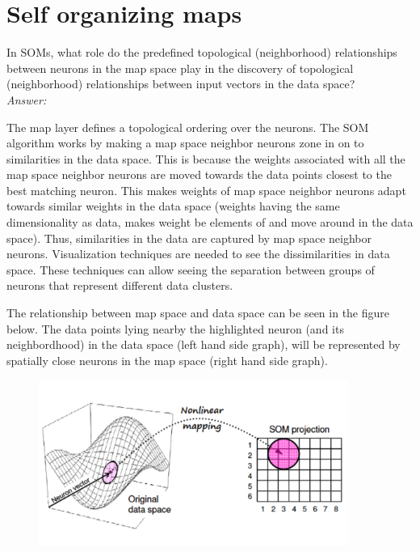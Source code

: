 \section{Self organizing maps}
In SOMs, what role do the predefined topological (neighborhood) relationships between neurons in the map space play in the discovery of topological (neighborhood) relationships between input vectors in the data space?\\

\textit{Answer:}

The map layer defines a topological ordering over the neurons. The SOM algorithm works by making a map space neighbor neurons zone in on to similarities in the data space.
This is because the weights associated with all the map space neighbor neurons are moved towards the data points closest to the best matching neuron.
This makes weights of map space neighbor neurons adapt towards similar weights in the data space (weights having the same dimensionality as data, makes weight be elements of and move around in the data space).
Thus, similarities in the data are captured by map space neighbor neurons.
Visualization techniques are needed to see the dissimilarities in data space.
These techniques can allow seeing the separation between groups of neurons that represent different data clusters.

The relationship between map space and data space can be seen in the figure below.
The data points lying nearby the highlighted neuron (and its neighbordhood) in the data space (left hand side graph), will be represented by spatially close neurons in the map space (right hand side graph).

\begin{figure}[H]
\begin{center}
\includegraphics[width=0.9\textwidth]{spaces.png}
\end{center}
\end{figure}

